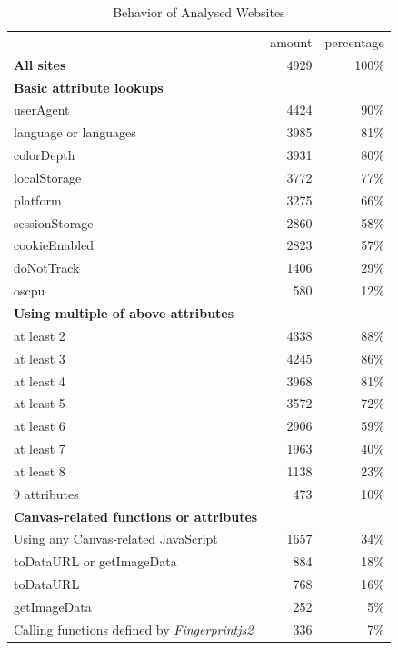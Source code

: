\documentclass[
    fontsize=12pt,
    headings=small,
    parskip=half,
    bibliography=totoc,
    numbers=noenddot,
    open=any
    ]{scrreprt}
\begin{document}
\renewcommand{\arraystretch}{1.2}
\begin{table}
\centering
\caption{Behavior of Analysed Websites}
\begin{tabular}{l r r}
    \toprule
    & amount & percentage \\
    \textbf{All sites} & 4929 & 100\% \\
    \midrule
    \textbf{Basic attribute lookups} & & \\
    userAgent & 4424 & 90\% \\ %
    language or languages & 3985 & 81\% \\ %
    colorDepth & 3931 & 80\% \\ %
    localStorage & 3772 & 77\% \\
    platform & 3275 & 66\% \\ %
    sessionStorage & 2860 & 58\% \\
    cookieEnabled & 2823 & 57\% \\ %
    doNotTrack & 1406 & 29\% \\ %
    oscpu & 580 & 12\% \\ %
    \midrule
    \textbf{Using multiple of above attributes} & & \\
    at least 2 & 4338 & 88\% \\
    at least 3 & 4245 & 86\% \\
    at least 4 & 3968 & 81\% \\
    at least 5 & 3572 & 72\% \\
    at least 6 & 2906 & 59\% \\
    at least 7 & 1963 & 40\% \\
    at least 8 & 1138 & 23\% \\
    9 attributes & 473 & 10\% \\
    \midrule
    \textbf{Canvas-related functions or attributes} & & \\
    Using any Canvas-related JavaScript & 1657 & 34\% \\ %
    toDataURL or getImageData & 884 & 18\% \\ %
    toDataURL & 768 & 16\% \\ %
    getImageData & 252 & 5\% \\ %
    \midrule
    Calling functions defined by \textit{Fingerprintjs2} & 336 & 7\% \\ %
    \bottomrule
\end{tabular}
\label{table:dataprops}
\end{table}
\end{document}
